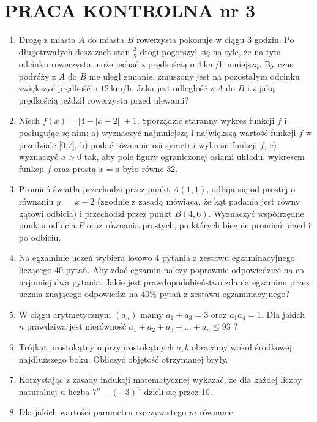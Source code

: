 \documentclass[10pt]{article}
\begin{document}
\section*{PRACA KONTROLNA nr 3}
\begin{enumerate}
  \item Drogę z miasta $A$ do miasta $B$ rowerzysta pokonuje w ciągu 3 godzin. Po długotrwałych deszczach stan $\frac{3}{5}$ drogi pogorszył się na tyle, że na tym odcinku rowerzysta może jechać z prędkością o $4 \mathrm{~km} / \mathrm{h}$ mniejszą. By czas podróży z $A$ do $B$ nie uległ zmianie, zmuszony jest na pozostałym odcinku zwiększyć prędkość o $12 \mathrm{~km} / \mathrm{h}$. Jaka jest odległość z $A$ do $B$ i z jaką prędkością jeździł rowerzysta przed ulewami?
  \item Niech $f(x)=|4-|x-2||+1$. Sporządzić staranny wykres funkcji $f$ i posługując sę nim: a) wyznaczyć najmniejszą i największą wartość funkcji $f$ w przedziale [0,7], b) podać równanie osi symetrii wykresu funkcji $f$, c) wyznaczyć $a>0$ tak, aby pole figury ograniczonej osiami układu, wykresem funkcji $f$ oraz prostą $x=a$ było równe 32.
  \item Promień światła przechodzi przez punkt $A(1,1)$, odbija się od prostej o równaniu $y=$ $x-2$ (zgodnie z zasadą mówiącą, że kąt padania jest równy kątowi odbicia) i przechodzi przez punkt $B(4,6)$. Wyznaczyć współrzędne punktu odbicia $P$ oraz równania prostych, po których biegnie promień przed i po odbiciu.
  \item Na egzaminie uczeń wybiera losowo 4 pytania z zestawu egzaminacyjnego liczącego 40 pytań. Aby zdać egzamin należy poprawnie odpowiedzieć na co najmniej dwa pytania. Jakie jest prawdopodobieństwo zdania egzaminu przez ucznia znającego odpowiedzi na $40 \%$ pytań z zestawu egzaminacyjnego?
  \item W ciągu arytmetycznym $\left(a_{n}\right)$ mamy $a_{1}+a_{3}=3$ oraz $a_{1} a_{4}=1$. Dla jakich $n$ prawdziwa jest nierówność $a_{1}+a_{2}+a_{3}+\ldots+a_{n} \leqslant 93$ ?
  \item Trójkąt prostokątny o przyprostokątnych $a, b$ obracamy wokół środkowej najdłuższego boku. Obliczyć objętość otrzymanej bryły.
  \item Korzystając z zasady indukcji matematycznej wykazać, że dla każdej liczby naturalnej $n$ liczba $7^{n}-(-3)^{n}$ dzieli się przez 10.
  \item Dla jakich wartości parametru rzeczywistego $m$ równanie
\end{enumerate}
\end{document}
